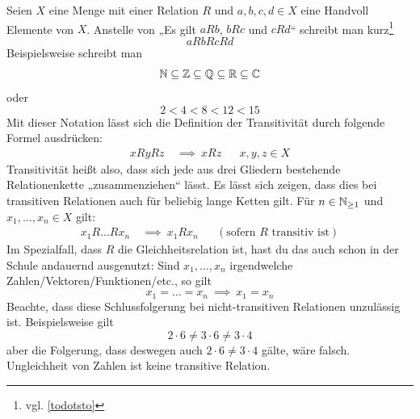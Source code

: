 \begin{bem} \label{kettenfalten}
    Seien $X$ eine Menge mit einer Relation $R$ und $a,b,c,d\in X$ eine Handvoll Elemente von $X$. Anstelle von „Es gilt $aRb$, $bRc$ und $cRd$“ schreibt man kurz\footnote{vgl. \cref{todotsto}}
        \[ aRbRcRd \]
    Beispielsweise schreibt man
        \[ \mathbb N \subseteq \mathbb Z\subseteq\mathbb Q\subseteq\mathbb R\subseteq \mathbb C \]
    oder
        \[ 2 < 4 < 8 < 12 < 15 \]
    Mit dieser Notation lässt sich die Definition der Transitivität durch folgende Formel ausdrücken:
    \begin{align*}
        xRyRz \ &\implies\ xRz && x,y,z\in X
    \end{align*}
    Transitivität heißt also, dass sich jede aus drei Gliedern bestehende Relationenkette „zusammenziehen“ lässt. Es lässt sich zeigen, dass dies bei transitiven Relationen auch für beliebig lange Ketten gilt. Für $n\in \mathbb N_{\ge 1}$ und $x_1,\dots , x_n\in X$ gilt:
    \begin{align*}
        x_1R \ldots Rx_n \ &\implies\ x_1Rx_n && (\text{sofern $R$ transitiv ist})
    \end{align*}
    Im Spezialfall, dass $R$ die Gleichheitsrelation ist, hast du das auch schon in der Schule andauernd ausgenutzt: Sind $x_1,\dots , x_n$ irgendwelche Zahlen/Vektoren/Funktionen/etc., so gilt
        \[ x_1=\ldots = x_n \ \implies\ x_1=x_n\]
    Beachte, dass diese Schlussfolgerung bei nicht-transitiven Relationen unzulässig ist. Beispielsweise gilt
        \[ 2\cdot 6 \neq 3\cdot 6\neq 3\cdot 4 \]
    aber die Folgerung, dass deswegen auch $2\cdot 6\neq 3\cdot 4$ gälte, wäre falsch. Ungleichheit von Zahlen ist keine transitive Relation.
\end{bem}


